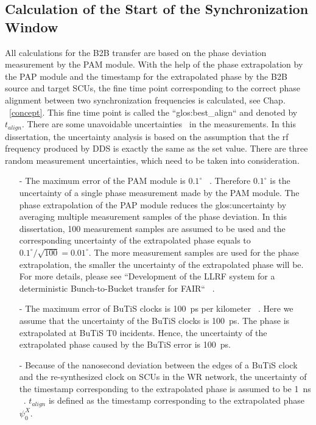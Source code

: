 \subsection{Calculation of the Start of the Synchronization Window}
All calculations for the B2B transfer are based on the phase deviation measurement by the PAM module. With the help of the phase extrapolation by the PAP module and the timestamp for the extrapolated phase by the B2B source and target SCUs, the fine time point corresponding to the correct phase alignment between two synchronization frequencies is calculated, see Chap. ~\ref{concept}. This fine time point is called the ``\gls{glos:best_align}`` and denoted by $t_\mathit{align}$. There are some unavoidable uncertainties~\cite{taylor_introduction_1982} in the measurements. In this dissertation, the uncertainty analysis is based on the assumption that the rf frequency produced by DDS is exactly the same as the set value. There are three random measurement uncertainties, which need to be taken into consideration.  
\begin{itemize}
\item[-]The maximum error of the PAM module is $0.1^\circ$ ~\cite{klingbeil_detailed_2013}. Therefore $0.1^\circ$ is the uncertainty of a single phase measurement made by the PAM module. The phase extrapolation of the PAP module reduces the \gls{glos:uncertainty} by averaging multiple measurement samples of the phase deviation. In this dissertation, 100 measurement samples are assumed to be used and the corresponding uncertainty of the extrapolated phase equals to $0.1^\circ/\sqrt{100} =0.01^\circ$. The more measurement samples are used for the phase extrapolation, the smaller the uncertainty of the extrapolated phase will be. For more details, please see ``Development of the LLRF system for a deterministic Bunch-to-Bucket transfer for FAIR`` ~\cite{ferrand_development_nodate}.
\item[-]The maximum error of BuTiS clocks is \SI{100}{\ps} per kilometer ~\cite{moritz_f-cs-rf-14e_2012}. Here we assume that the uncertainty of the BuTiS clocks is \SI{100}{\ps}. The phase is extrapolated at BuTiS T0 incidents. Hence, the uncertainty of the extrapolated phase caused by the BuTiS error is \SI{100}{\ps}. 
\item[-]Because of the nanosecond deviation between the edges of a BuTiS clock and the re-synthesized clock on SCUs in the WR network, the uncertainty of the timestamp corresponding to the extrapolated phase is assumed to be \SI{1}{ns} ~\cite{kreider_receiver_2014}. $t_\mathit{align}$ is defined as the timestamp corresponding to the extrapolated phase $\psi^\mathit{X}_0$.
\end{itemize}
 
